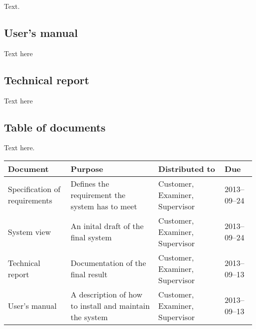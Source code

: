 Text.

\subsection{User's manual}
Text here

\subsection{Technical report}
Text here

\subsection{Table of documents}
Text here.

\vspace{0.5cm}

\begin{tabular} {|p{2.7cm}|p{7.3cm}|p{2.7cm}|p{2cm}|}
		\hline
		\textbf{Document} & \textbf{Purpose} & \textbf{Distributed to} & \textbf{Due} \\
		\hline
		Specification of requirements & Defines the requirement the system has to meet & Customer, Examiner, Supervisor & 2013--09--24 \\
		\hline
		System view & An inital draft of the final system & Customer, Examiner, Supervisor & 2013--09--24 \\
		\hline
		Technical report & Documentation of the final result & Customer, Examiner, Supervisor & 2013--09--13 \\
		\hline
		User's manual & A description of how to install and maintain the system & Customer, Examiner, Supervisor & 2013--09--13 \\				
		\hline
\end{tabular}